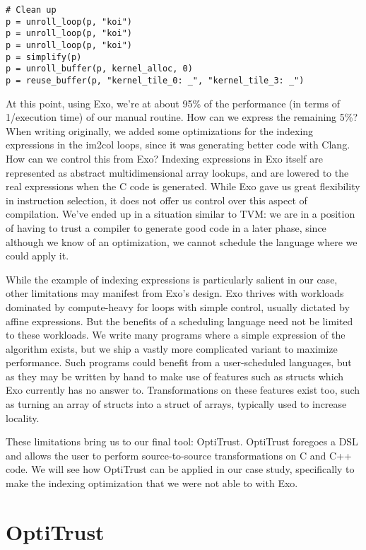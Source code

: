 \documentclass[acmsmall, nonacm=true]{acmart}
\begin{document}
\begin{verbatim}
# Clean up
p = unroll_loop(p, "koi")
p = unroll_loop(p, "koi")
p = unroll_loop(p, "koi")
p = simplify(p)
p = unroll_buffer(p, kernel_alloc, 0)
p = reuse_buffer(p, "kernel_tile_0: _", "kernel_tile_3: _")
\end{verbatim}

At this point, using Exo, we're at about 95\% of the performance (in terms of 1/execution time) of our manual routine. How can we express the remaining 5\%? When writing originally, we added some optimizations for the indexing expressions in the im2col loops, since it was generating better code with Clang. How can we control this from Exo? Indexing expressions in Exo itself are represented as abstract multidimensional array lookups, and are lowered to the real expressions when the C code is generated. While Exo gave us great flexibility in instruction selection, it does not offer us control over this aspect of compilation. We've ended up in a situation similar to TVM: we are in a position of having to trust a compiler to generate good code in a later phase, since although we know of an optimization, we cannot schedule the language where we could apply it. 

While the example of indexing expressions is particularly salient in our case, other limitations may manifest from Exo's design. Exo thrives with workloads dominated by compute-heavy for loops with simple control, usually dictated by affine expressions. But the benefits of a scheduling language need not be limited to these workloads. We write many programs where a simple expression of the algorithm exists, but we ship a vastly more complicated variant to maximize performance. Such programs could benefit from a user-scheduled languages, but as they may be written by hand to make use of features such as structs which Exo currently has no answer to. Transformations on these features exist too, such as turning an array of structs into a struct of arrays, typically used to increase locality. %

These limitations bring us to our final tool: OptiTrust. OptiTrust foregoes a DSL and allows the user to perform source-to-source transformations on C and C++ code. We will see how OptiTrust can be applied in our case study, specifically to make the indexing optimization that we were not able to with Exo.

\section{OptiTrust}
\end{document}
